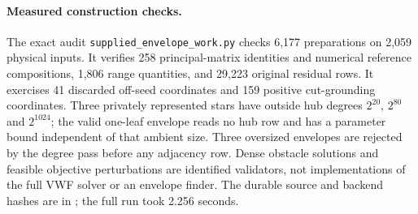 \paragraph{Measured construction checks.}
The exact audit \texttt{supplied\_envelope\_work.py} checks 6,177
preparations on 2,059 physical inputs. It verifies 258 principal-matrix
identities and numerical reference compositions, 1,806 range quantities,
and 29,223 original residual rows. It exercises 41 discarded off-seed
coordinates and 159 positive cut-grounding coordinates. Three privately
represented stars have outside hub degrees $2^{20}$, $2^{80}$ and
$2^{1024}$; the valid one-leaf envelope reads no hub row and has a
parameter bound independent of that ambient size. Three oversized
envelopes are rejected by the degree pass before any adjacency row.
Dense obstacle solutions and feasible objective perturbations are
identified validators, not implementations of the full VWF solver or
an envelope finder. The durable source and backend hashes are in
; the full run took 2.256 seconds.
